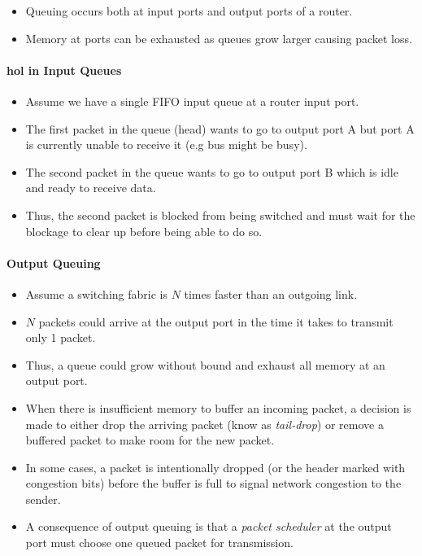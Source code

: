 \documentclass{article}
\begin{document}
\begin{itemize}
    \item Queuing occurs both at input ports and output ports of a router.
    \item Memory at ports can be exhausted as queues grow larger causing packet loss.
\end{itemize}

\paragraph{\Gls*{hol} in Input Queues}

\begin{itemize}
    \item Assume we have a single FIFO input queue at a router input port.
    \item The first packet in the queue (head) wants to go to output port A but port A is currently unable to receive it (e.g bus might be busy).
    \item The second packet in the queue wants to go to output port B which is idle and ready to receive data.
    \item Thus, the second packet is blocked from being switched and must wait for the blockage to clear up before being able to do so.
\end{itemize}

\paragraph{Output Queuing}
\begin{itemize}
    \item Assume a switching fabric is $N$ times faster than an outgoing link.
    \item $N$ packets could arrive at the output port in the time it takes to transmit only 1 packet.
    \item Thus, a queue could grow without bound and exhaust all memory at an output port.
    \item When there is insufficient memory to buffer an incoming packet, a decision is made to either drop the arriving packet (know as \emph{tail-drop}) or remove a buffered packet to make room for the new packet.
    \item In some cases, a packet is intentionally dropped (or the header marked with congestion bits) before the buffer is full to signal network congestion to the sender.
    \item A consequence of output queuing is that a \emph{packet scheduler} at the output port must choose one queued packet for transmission.
\end{itemize}
\end{document}
